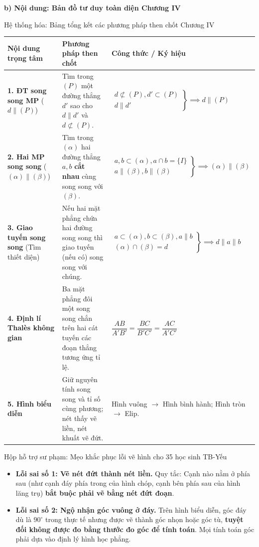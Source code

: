 \documentclass[12pt, a4paper]{article}
\begin{document}
\noindent \textbf{b) Nội dung: Bản đồ tư duy toàn diện Chương IV}
\begin{pedabox}{Hệ thống hóa: Bảng tổng kết các phương pháp then chốt Chương IV}
\small
\begin{tabularx}{\textwidth}{|p{4.0cm}|p{6.0cm}|X|}
\hline
\textbf{Nội dung trọng tâm} & \textbf{Phương pháp then chốt} & \textbf{Công thức / Ký hiệu} \\ \hline
\textbf{1. ĐT song song MP} ($d \parallel (P)$) & Tìm trong $(P)$ một đường thẳng $d'$ sao cho $d \parallel d'$ và $d \not\subset (P)$. & $\left.\begin{array}{l} d \not\subset (P), d' \subset (P) \\ d \parallel d' \end{array}\right\} \implies d \parallel (P)$ \\ \hline
\textbf{2. Hai MP song song} ($(\alpha) \parallel (\beta)$) & Tìm trong $(\alpha)$ hai đường thẳng $a, b$ \textbf{cắt nhau} cùng song song với $(\beta)$. & $\left.\begin{array}{l} a, b \subset (\alpha), a \cap b = \{I\} \\ a \parallel (\beta), b \parallel (\beta) \end{array}\right\} \implies (\alpha) \parallel (\beta)$ \\ \hline
\textbf{3. Giao tuyến song song} (Tìm thiết diện) & Nếu hai mặt phẳng chứa hai đường song song thì giao tuyến (nếu có) song song với chúng. & $\left.\begin{array}{l} a \subset (\alpha), b \subset (\beta), a \parallel b \\ (\alpha) \cap (\beta) = d \end{array}\right\} \implies d \parallel a \parallel b$ \\ \hline
\textbf{4. Định lí Thalès không gian} & Ba mặt phẳng đôi một song song chắn trên hai cát tuyến các đoạn thẳng tương ứng tỉ lệ. & $\dfrac{AB}{A'B'} = \dfrac{BC}{B'C'} = \dfrac{AC}{A'C'}$ \\ \hline
\textbf{5. Hình biểu diễn} & Giữ nguyên tính song song và tỉ số cùng phương; nét thấy vẽ liền, nét khuất vẽ đứt. & Hình vuông $\rightarrow$ Hình bình hành; Hình tròn $\rightarrow$ Elip. \\ \hline
\end{tabularx}
\end{pedabox}

\begin{scaffoldbox}{Hộp hỗ trợ sư phạm: Mẹo khắc phục lỗi vẽ hình cho 35 học sinh TB-Yếu}
\begin{itemize}[leftmargin=0.6cm]
    \item \textbf{Lỗi sai số 1: Vẽ nét đứt thành nét liền.}
    Quy tắc: Cạnh nào nằm ở phía sau (như cạnh đáy phía trong của hình chóp, cạnh bên phía sau của hình lăng trụ) \textbf{bắt buộc phải vẽ bằng nét đứt đoạn}.
    \item \textbf{Lỗi sai số 2: Ngộ nhận góc vuông ở đáy.}
    Trên hình biểu diễn, góc đáy dù là $90^\circ$ trong thực tế nhưng được vẽ thành góc nhọn hoặc góc tù, \textbf{tuyệt đối không được đo bằng thước đo góc để tính toán}. Mọi tính toán góc phải dựa vào định lý hình học phẳng.
\end{itemize}
\end{scaffoldbox}
\end{document}
